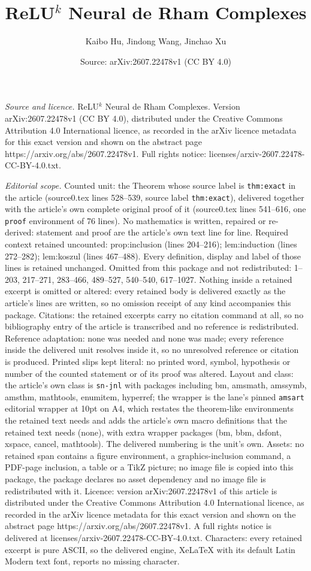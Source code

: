 \documentclass[10pt,a4paper]{amsart}
\title[ReLU$^k$ Neural de Rham Complexes]{ReLU$^k$ Neural de Rham Complexes}
\author{Kaibo Hu, Jindong Wang, Jinchao Xu}
\date{Source: arXiv:2607.22478v1 (CC BY 4.0)}
\begin{document}
\maketitle

\noindent\emph{Source and licence.} ReLU$^k$ Neural de Rham Complexes. Version arXiv:2607.22478v1 (CC BY 4.0), distributed under the Creative Commons Attribution 4.0 International licence, as recorded in the arXiv licence metadata for this exact version and shown on the abstract page https://arxiv.org/abs/2607.22478v1. Full rights notice: licenses/arxiv-2607.22478-CC-BY-4.0.txt.\par\smallskip

\noindent\textit{Editorial scope.} Counted unit: the Theorem whose source label is \texttt{thm:exact} in the article (source0.tex lines 528--539, source label \texttt{thm:exact}), delivered together with the article's own complete original proof of it (source0.tex lines 541--616, one \texttt{proof} environment of 76 lines). No mathematics is written, repaired or re-derived: statement and proof are the article's own text line for line. Required context retained uncounted: prop:inclusion (lines 204--216); lem:induction (lines 272--282); lem:koszul (lines 467--488). Every definition, display and label of those lines is retained unchanged. Omitted from this package and not redistributed: 1--203, 217--271, 283--466, 489--527, 540--540, 617--1027. Nothing inside a retained excerpt is omitted or altered: every retained body is delivered exactly as the article's lines are written, so no omission receipt of any kind accompanies this package. Citations: the retained excerpts carry no citation command at all, so no bibliography entry of the article is transcribed and no reference is redistributed. Reference adaptation: none was needed and none was made; every reference inside the delivered unit resolves inside it, so no unresolved reference or citation is produced. Printed slips kept literal: no printed word, symbol, hypothesis or number of the counted statement or of its proof was altered. Layout and class: the article's own class is \texttt{sn-jnl} with packages including bm, amsmath, amssymb, amsthm, mathtools, enumitem, hyperref; the wrapper is the lane's pinned \texttt{amsart} editorial wrapper at 10pt on A4, which restates the theorem-like environments the retained text needs and adds the article's own macro definitions that the retained text needs (none), with extra wrapper packages (bm, bbm, dsfont, xspace, cancel, mathtools). The delivered numbering is the unit's own. Assets: no retained span contains a figure environment, a graphics-inclusion command, a PDF-page inclusion, a table or a TikZ picture; no image file is copied into this package, the package declares no asset dependency and no image file is redistributed with it. Licence: version arXiv:2607.22478v1 of this article is distributed under the Creative Commons Attribution 4.0 International licence, as recorded in the arXiv licence metadata for this exact version and shown on the abstract page https://arxiv.org/abs/2607.22478v1. A full rights notice is delivered at licenses/arxiv-2607.22478-CC-BY-4.0.txt. Characters: every retained excerpt is pure ASCII, so the delivered engine, XeLaTeX with its default Latin Modern text font, reports no missing character.
\end{document}
